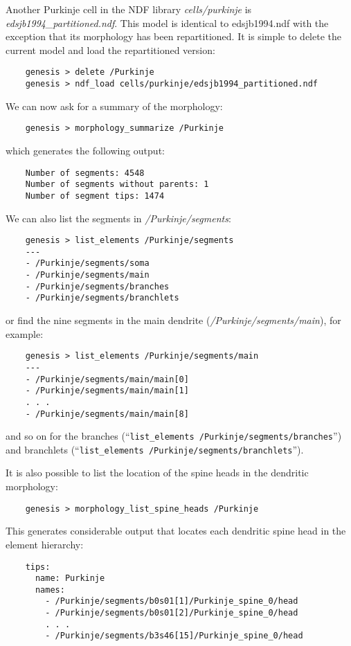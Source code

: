 \documentclass[12pt]{article}
\begin{document}
Another Purkinje cell in the NDF library {\it cells/purkinje} is {\it edsjb1994\_partitioned.ndf}. This model is identical to edsjb1994.ndf with the exception that its morphology has been repartitioned. It is simple to delete the current model and load the repartitioned version:
\begin{verbatim}
    genesis > delete /Purkinje
    genesis > ndf_load cells/purkinje/edsjb1994_partitioned.ndf
\end{verbatim}
We can now ask for a summary of the morphology:
\begin{verbatim}
    genesis > morphology_summarize /Purkinje
\end{verbatim}
which generates the following output:
\begin{verbatim}
    Number of segments: 4548
    Number of segments without parents: 1
    Number of segment tips: 1474
\end{verbatim}
We can also list the segments in {\it /Purkinje/segments}:
\begin{verbatim}
    genesis > list_elements /Purkinje/segments
    ---
    - /Purkinje/segments/soma
    - /Purkinje/segments/main
    - /Purkinje/segments/branches
    - /Purkinje/segments/branchlets
\end{verbatim}
or find the nine segments in the main dendrite ({\it /Purkinje/segments/main}), for example:
\begin{verbatim}
    genesis > list_elements /Purkinje/segments/main
    ---
    - /Purkinje/segments/main/main[0]
    - /Purkinje/segments/main/main[1]
    . . . 
    - /Purkinje/segments/main/main[8]
\end{verbatim}
and so on for the branches (``{\tt list\_elements /Purkinje/segments/branches}'') and branchlets (``{\tt list\_elements /Purkinje/segments/branchlets}'').

It is also possible to list the location of the spine heads in the dendritic morphology:
\begin{verbatim}
    genesis > morphology_list_spine_heads /Purkinje
\end{verbatim}
This generates considerable output that locates each dendritic spine head in the element hierarchy:
\begin{verbatim}
    tips:
      name: Purkinje
      names:
        - /Purkinje/segments/b0s01[1]/Purkinje_spine_0/head
        - /Purkinje/segments/b0s01[2]/Purkinje_spine_0/head
        . . .
        - /Purkinje/segments/b3s46[15]/Purkinje_spine_0/head
\end{verbatim}
\end{document}
